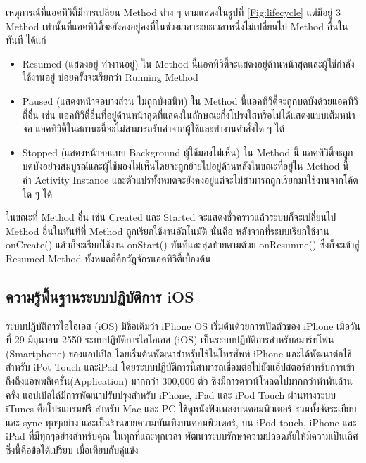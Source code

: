 	เหตุการณ์ที่แอคทิวิตี้มีการเปลี่ยน Method ต่าง ๆ ตามแสดงในรูปที่  \ref{Fig:lifecycle}
	แต่มีอยู่ 3 Method เท่านั้นที่แอคทิวิตี้จะยังคงอยู่คงที่ในช่วงเวลาระยะเวลาหนึ่งไม่เปลี่ยนไป Method อื่นในทันที ได้แก่
		\begin{itemize}
		\item Resumed (แสดงอยู่ ทำงานอยู่) ใน Method นี้แอคทิวิตี้จะแสดงอยู่ด้านหน้าสุดและผู้ใช้กำลังใช้งานอยู่ บ่อยครั้งจะเรียกว่า Running Method
		\item Paused (แสดงหน้าจอบางส่วน ไม่ถูกบังสนิท) ใน Method นี้แอคทิวิตี้จะถูกบดบังด้วยแอคทิวิตี้อื่น เช่น แอคทิวิตี้อื่นที่อยู่ด้านหน้าสุดที่แสดงในลักษณะกึ่งโปรงใสหรือไม่ได้แสดงแบบเต็มหน้าจอ  แอคทิวิตี้ในสถานะนี้จะไม่สามารถรับค่าจากผู้ใช้และทำงานคำสั่งใด ๆ ได้
		\item Stopped (แสดงหน้าจอแบบ Background ผู้ใช้มองไม่เห็น) ใน Method นี้ แอคทิวิตี้จะถูกบดบังอย่างสมบูรณ์และผู้ใช้มองไม่เห็นโดยจะถูกย้ายไปอยู่ด้านหลังในขณะที่อยู่ใน Method นี้
		ค่า Activity Instance และตัวแปรทั้งหมดจะยังคงอยู่แต่จะไม่สามารถถูกเรียกมาใช้งานจากโค้ดใด ๆ ได้
		\end{itemize}

		ในขณะที่ Method อื่น เช่น Created และ Started จะแสดงชั่วคราวแล้วระบบก็จะเปลี่ยนไป Method อื่นในทันทีที่ Method ถูกเรียกใช้งานอัตโนมัติ นั่นคือ หลังจากที่ระบบเรียกใช้งาน onCreate() แล้วก็จะเรียกใช้งาน onStart() ทันทีและสุดท้ายตามด้วย onResumne()  ซึ่งก็จะเข้าสู่ Resumed Method ทั้งหมดก็คือวัฏจักรแอคทิวิตี้เบื้องต้น

	\subsection{ความรู้พื้นฐานระบบปฏิบัติการ iOS}
	ระบบปฏิบัติการไอโอเอส (iOS) มีชื่อเดิมว่า iPhone OS เริ่มต้นด้วยการเปิดตัวของ iPhone เมื่อวันที่ 29 มิถุนายน 2550 ระบบปฏิบัติการไอโอเอส (iOS) เป็นระบบปฏิบัติการสำหรับสมาร์ทโฟน (Smartphone) ของแอปเปิล โดยเริ่มต้นพัฒนาสำหรับใช้ในโทรศัพท์ iPhone และได้พัฒนาต่อใช้สำหรับ iPot Touch และiPad โดยระบบปฏิบัติการนี้สามารถเชื่อมต่อไปยังแอ็ปสตอร์สำหรับการเข้าถึงถึงแอพพลิเคชั่น(Application) มากกว่า 300,000 ตัว ซึ่งมีการดาวน์โหลดไปมากกว่าห้าพันล้านครั้ง แอปเปิลได้มีการพัฒนาปรับปรุงสำหรับ iPhone, iPad และ iPod Touch ผ่านทางระบบ iTunes คือโปรแกรมฟรี สำหรับ Mac และ PC ใช้ดูหนังฟังเพลงบนคอมพิวเตอร์ รวมทั้งจัดระเบียบและ sync ทุกๆอย่าง และเป็นร้านขายความบันเทิงบนคอมพิวเตอร์, บน iPod touch, iPhone และ iPad ที่มีทุกๆอย่างสำหรับคุณ ในทุกที่และทุกเวลา พัฒนาระบบรักษาความปลอดภัยให้มีความเป็นเลิศ ซึ่งนี้คือข้อได้เปรียบ เมื่อเทียบกับคู่แข่ง	
	
